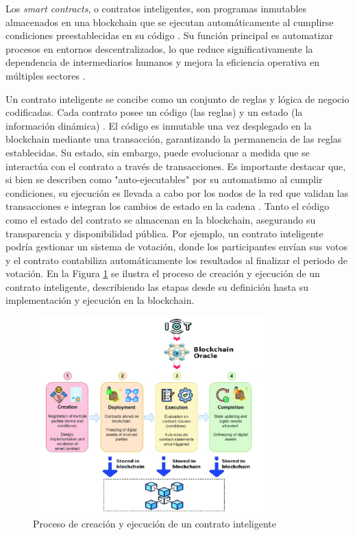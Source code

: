 Los \textit{smart contracts}, o contratos inteligentes, son programas inmutables almacenados en una blockchain que se ejecutan automáticamente al cumplirse condiciones preestablecidas en su código \cite{bulkowska2023implementation}. Su función principal es automatizar procesos en entornos descentralizados, lo que reduce significativamente la dependencia de intermediarios humanos \cite{verma2023overview} y mejora la eficiencia operativa en múltiples sectores \cite{sunny2022systematic}.

Un contrato inteligente se concibe como un conjunto de reglas y lógica de negocio codificadas. Cada contrato posee un código (las reglas) y un estado (la información dinámica) \cite{buterin2013ethereum}. El código es inmutable una vez desplegado en la blockchain mediante una transacción, garantizando la permanencia de las reglas establecidas. Su estado, sin embargo, puede evolucionar a medida que se interactúa con el contrato a través de transacciones. Es importante destacar que, si bien se describen como "auto-ejecutables" por su automatismo al cumplir condiciones, su ejecución es llevada a cabo por los nodos de la red que validan las transacciones e integran los cambios de estado en la cadena \cite{buterin2013ethereum}. Tanto el código como el estado del contrato se almacenan en la blockchain, asegurando su transparencia y disponibilidad pública. Por ejemplo, un contrato inteligente podría gestionar un sistema de votación, donde los participantes envían sus votos y el contrato contabiliza automáticamente los resultados al finalizar el periodo de votación. En la Figura \ref{fig:smart-contract-process} se ilustra el proceso de creación y ejecución de un contrato inteligente, describiendo las etapas desde su definición hasta su implementación y ejecución en la blockchain.

\begin{figure}[h]
    \centering
    \includegraphics[width=0.8\textwidth]{Figures/smart-contract-process.png}
    \caption{Proceso de creación y ejecución de un contrato inteligente}
    \label{fig:smart-contract-process}
\end{figure}

